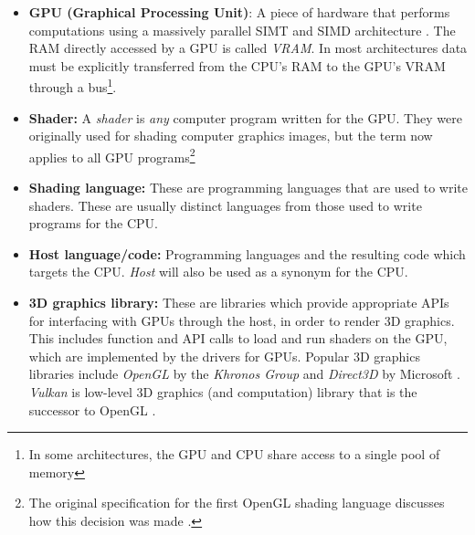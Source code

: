 \documentclass[a4paper,12pt,twoside,openright]{report}
\begin{document}
\begin{itemize}

    \item \textbf{GPU (Graphical Processing Unit)}: A piece of hardware that
    performs computations using a massively parallel SIMT and SIMD architecture
    \cite{TODO}. The RAM directly accessed by a GPU is called \textit{VRAM}. In
    most architectures data must be explicitly transferred from the CPU's RAM
    to the GPU's VRAM through a bus\footnote{In some architectures, the GPU and
    CPU share access to a single pool of memory\cite{TODO}}.

    \item \textbf{Shader:} A \textit{shader} is \textit{any} computer
    program written for the GPU. They were originally used for shading computer
    graphics images, but the term now applies to all GPU programs\footnote{The
    original specification for the first OpenGL shading language discusses how
    this decision was made \cite{GLSL_1_10}.}

    \item \textbf{Shading language:} These are programming languages that are
    used to write shaders. These are usually distinct languages from those used
    to write programs for the CPU.

    \item \textbf{Host language/code:} Programming languages and the resulting
    code which targets the CPU. \textit{Host} will also be used as a synonym
    for the CPU.

    \item \textbf{3D graphics library:} These are libraries which provide
    appropriate APIs for interfacing with GPUs through the host, in order to
    render 3D graphics. This includes function and API calls to load and run
    shaders on the GPU, which are implemented by the drivers for GPUs. Popular
    3D graphics libraries include \textit{OpenGL} by the \textit{Khronos Group}
    and \textit{Direct3D} by Microsoft \cite{OpenGL} \cite{Direct3D}.
    \textit{Vulkan} is low-level 3D graphics (and computation) library that is
    the successor to OpenGL \cite{Vulkan}.



\end{itemize}
\end{document}
